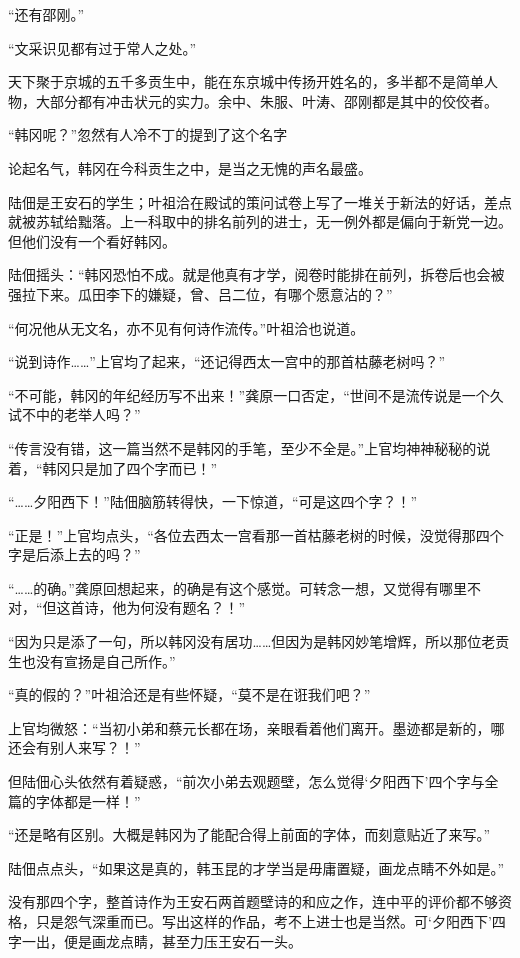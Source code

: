 “还有邵刚。”

“文采识见都有过于常人之处。”

天下聚于京城的五千多贡生中，能在东京城中传扬开姓名的，多半都不是简单人物，大部分都有冲击状元的实力。余中、朱服、叶涛、邵刚都是其中的佼佼者。

“韩冈呢？”忽然有人冷不丁的提到了这个名字

论起名气，韩冈在今科贡生之中，是当之无愧的声名最盛。

陆佃是王安石的学生；叶祖洽在殿试的策问试卷上写了一堆关于新法的好话，差点就被苏轼给黜落。上一科取中的排名前列的进士，无一例外都是偏向于新党一边。但他们没有一个看好韩冈。

陆佃摇头：“韩冈恐怕不成。就是他真有才学，阅卷时能排在前列，拆卷后也会被强拉下来。瓜田李下的嫌疑，曾、吕二位，有哪个愿意沾的？”

“何况他从无文名，亦不见有何诗作流传。”叶祖洽也说道。

“说到诗作……”上官均了起来，“还记得西太一宫中的那首枯藤老树吗？”

“不可能，韩冈的年纪经历写不出来！”龚原一口否定，“世间不是流传说是一个久试不中的老举人吗？”

“传言没有错，这一篇当然不是韩冈的手笔，至少不全是。”上官均神神秘秘的说着，“韩冈只是加了四个字而已！”

“……夕阳西下！”陆佃脑筋转得快，一下惊道，“可是这四个字？！”

“正是！”上官均点头，“各位去西太一宫看那一首枯藤老树的时候，没觉得那四个字是后添上去的吗？”

“……的确。”龚原回想起来，的确是有这个感觉。可转念一想，又觉得有哪里不对，“但这首诗，他为何没有题名？！”

“因为只是添了一句，所以韩冈没有居功……但因为是韩冈妙笔增辉，所以那位老贡生也没有宣扬是自己所作。”

“真的假的？”叶祖洽还是有些怀疑，“莫不是在诳我们吧？”

上官均微怒：“当初小弟和蔡元长都在场，亲眼看着他们离开。墨迹都是新的，哪还会有别人来写？！”

但陆佃心头依然有着疑惑，“前次小弟去观题壁，怎么觉得‘夕阳西下’四个字与全篇的字体都是一样！”

“还是略有区别。大概是韩冈为了能配合得上前面的字体，而刻意贴近了来写。”

陆佃点点头，“如果这是真的，韩玉昆的才学当是毋庸置疑，画龙点睛不外如是。”

没有那四个字，整首诗作为王安石两首题壁诗的和应之作，连中平的评价都不够资格，只是怨气深重而已。写出这样的作品，考不上进士也是当然。可‘夕阳西下’四字一出，便是画龙点睛，甚至力压王安石一头。

